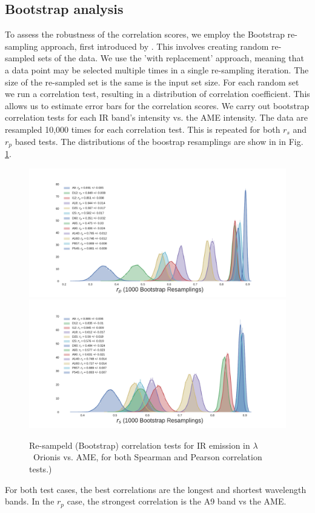 {            \subsection{Bootstrap analysis}
                To assess the robustness of the correlation scores, we employ the Bootstrap re-sampling approach, first introduced by \cite{efron79}. This involves creating random re-sampled sets of the data. We use the 'with replacement' approach, meaning that a data point may be selected multiple times in a single re-sampling iteration. The size of the re-sampled set is the same is the input set size. For each random set we run a correlation test, resulting in a distribution of correlation coefficient. This allows us to estimate error bars for the correlation scores.
                We carry out bootstrap correlation tests for each IR band's intensity vs. the AME intensity. The data are resampled 10,000 times for each correlation test. This is repeated for both $r_{s}$ and $r_{p}$ based tests. The distributions of the boostrap resamplings are show in in Fig. \ref{fig:bootstrap_vs_AME}.
                    \begin{figure}
                      \includegraphics[width=\textwidth]{../Plots/ch_lori/bootstrap_vs_AME_pearson_i1000.pdf}
                      \includegraphics[width=\textwidth]{../Plots/ch_lori/bootstrap_vs_AME_spearman_i1000.pdf}
                      \centering
                      \caption{Re-sampeld (Bootstrap) correlation tests for IR emission in $\lambda$~Orionis vs. AME, for both Spearman and Pearson correlation tests.) }
                      \label{fig:bootstrap_vs_AME}
                    \end{figure}
                For both test cases, the best correlations are the longest and shortest wavelength bands. In the $r_{p}$ case, the strongest correlation is the A9 band vs the AME.
}
